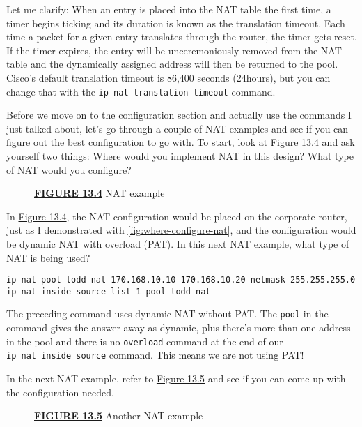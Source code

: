 Let me clarify: When an entry is placed into the NAT table the first
time, a timer begins ticking and its duration is known as the
translation timeout. Each time a packet for a given entry translates
through the router, the timer gets reset. If the timer expires, the
entry will be unceremoniously removed from the NAT table and the
dynamically assigned address will then be returned to the pool. Cisco's
default translation timeout is 86,400 seconds (24hours), but you can
change that with the \texttt{ip\ nat\ translation\ timeout} command.

Before we move on to the configuration section and actually use the
commands I just talked about, let's go through a couple of NAT examples
and see if you can figure out the best configuration to go with. To
start, look at \protect\hyperlink{c13.xhtmlux5cux23figure13-4}{Figure
13.4} and ask yourself two things: Where would you implement NAT in this
design? What type of NAT would you configure?



\begin{figure}
\centering

\caption{{\protect\hyperlink{c13.xhtmlux5cux23figureanchor13-4}{\textbf{FIGURE
13.4}} NAT example}}
\end{figure}

In \protect\hyperlink{c13.xhtmlux5cux23figure13-4}{Figure 13.4}, the NAT
configuration would be placed on the corporate router, just as I
demonstrated with \cref{fig:where-configure-nat}, and the configuration would be dynamic NAT with overload (PAT).
In this next NAT example, what type of NAT is being used?

\begin{verbatim}
ip nat pool todd-nat 170.168.10.10 170.168.10.20 netmask 255.255.255.0
ip nat inside source list 1 pool todd-nat
\end{verbatim}

The preceding command uses dynamic NAT without PAT. The \texttt{pool} in
the command gives the answer away as dynamic, plus there's more than one
address in the pool and there is no \texttt{overload} command at the end
of our \texttt{ip\ nat\ inside\ source} command. This means we are not
using PAT!

In the next NAT example, refer to
\protect\hyperlink{c13.xhtmlux5cux23figure13-5}{Figure 13.5} and see if
you can come up with the configuration needed.

\begin{figure}
\centering

\caption{{\protect\hyperlink{c13.xhtmlux5cux23figureanchor13-5}{\textbf{FIGURE
13.5}} Another NAT example}}
\end{figure}

